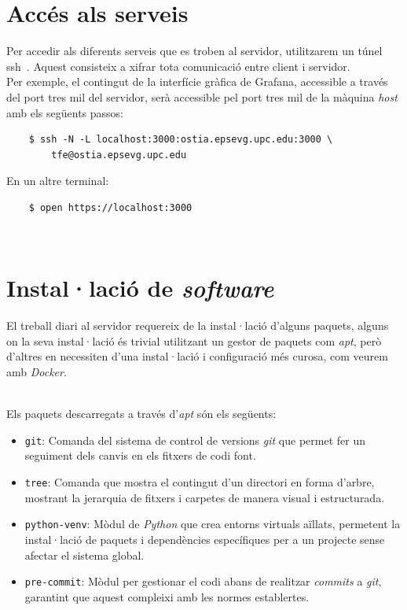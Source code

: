 \clearpage

\section*{Accés als serveis}\label{sec:server-access}

\noindent
Per accedir als diferents serveis que es troben al servidor, utilitzarem un túnel \gls{ssh}~\cite{tunel-ssh}.
Aquest consisteix a xifrar tota comunicació entre client i servidor. \\

\noindent
Per exemple, el contingut de la interfície gràfica de Grafana, accessible a través del port tres mil del servidor,
serà accessible pel port tres mil de la màquina \textit{host} amb els següents passos:

\begin{verbatim}
    $ ssh -N -L localhost:3000:ostia.epsevg.upc.edu:3000 \
        tfe@ostia.epsevg.upc.edu
\end{verbatim}

\noindent
En un altre terminal:

\begin{verbatim}
    $ open https://localhost:3000
\end{verbatim}

\noindent \\
\section*{Instal·lació de \textit{software}}\label{sec:software-installation}

El treball diari al servidor requereix de la instal·lació d'alguns paquets, alguns on la seva instal·lació és trivial utilitzant un gestor de paquets com \textit{\textit{apt}}, però d'altres en necessiten d'una instal·lació i configuració més curosa, com veurem amb \textit{\gls{Docker}}.

\noindent \\
Els paquets descarregats a través d'\textit{\gls{apt}} són els següents:

\begin{itemize}
    \item \texttt{git}: Comanda del sistema de control de versions \textit{\gls{git}} que permet fer un seguiment dels canvis en els fitxers de codi font.
    \item \texttt{tree}: Comanda que mostra el contingut d'un directori en forma d'arbre, mostrant la jerarquia de fitxers i carpetes de manera visual i estructurada.
    \item \texttt{python-venv}: Mòdul de \textit{Python} que crea entorns virtuals aïllats, permetent la instal·lació de paquets i dependències específiques per a un projecte sense afectar el sistema global.
    \item \texttt{pre-commit}: Mòdul per gestionar el codi abans de realitzar \textit{\gls{commit}s} a \textit{\gls{git}}, garantint que aquest compleixi amb les normes establertes.
\end{itemize}

